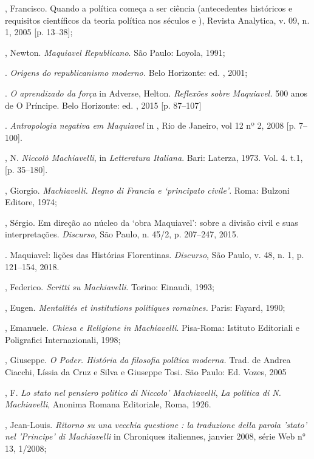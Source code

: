 \begin{bibliohedra}
, Francisco. Quando a política começa a ser ciência
(antecedentes históricos e requisitos científicos da teoria política nos
séculos  e ), Revista Analytica, v. 09, n. 1, 2005 {[}p.
13--38{]};

, Newton. \emph{Maquiavel Republicano}. São Paulo: Loyola, 1991;

\titidem. \emph{Origens do republicanismo moderno.} Belo
Horizonte: ed. , 2001;

\titidem. \emph{O aprendizado da força} in Adverse, Helton.
\emph{Reflexões sobre Maquiavel.} 500 anos de O Príncipe. Belo
Horizonte: ed. , 2015 {[}p. 87--107{]}

\titidem. \emph{Antropologia negativa em Maquiavel} in , Rio
de Janeiro, vol 12 nº 2, 2008 {[}p. 7--100{]}.

, N. \emph{Niccolò Machiavelli}, in \emph{Letteratura
Italiana}. Bari: Laterza, 1973. Vol. 4. t.1, {[}p. 35--180{]}.

, Giorgio. \emph{Machiavelli. Regno di Francia e `principato
civile'}. Roma: Bulzoni Editore, 1974;

, Sérgio. Em direção ao núcleo da `obra Maquiavel': sobre a
divisão civil e suas interpretações. \emph{Discurso}, São Paulo, n.
45/2, p. 207--247, 2015.

\titidem. Maquiavel: lições das Histórias Florentinas.
\emph{Discurso}, São Paulo, v. 48, n. 1, p. 121--154, 2018.

, Federico. \emph{Scritti su Machiavelli}. Torino: Einaudi, 1993;

, Eugen. \emph{Mentalités et institutions politiques romaines.}
Paris: Fayard, 1990;

, Emanuele. \emph{Chiesa e Religione in Machiavelli}.
Pisa-Roma: Istituto Editoriali e Poligrafici Internazionali, 1998;

, Giuseppe. \emph{O Poder. História da filosofia política moderna.}
Trad. de Andrea Ciacchi, Líssia da Cruz e Silva e Giuseppe Tosi. São
Paulo: Ed. Vozes, 2005

, F. \emph{Lo stato nel pensiero politico di Niccolo'
Machiavelli}, \emph{La politica di N. Machiavelli}, Anonima Romana
Editoriale, Roma, 1926.

, Jean-Louis. \emph{Ritorno su una vecchia questione : la
traduzione della parola 'stato' nel 'Principe' di Machiavelli} in
Chroniques italiennes, janvier 2008, série Web n° 13, 1/2008;


\end{bibliohedra}
